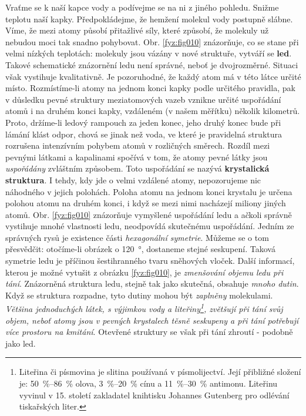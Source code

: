       Vraťme se k naší kapce vody a podívejme se na ni z jiného pohledu. Snižme teplotu naší kapky.
      Předpokládejme, že hemžení molekul vody postupně slábne. Víme, že mezi atomy působí přitažlivé
      síly, které způsobí, že molekuly už nebudou moci tak snadno pohybovat. Obr. \ref{fyz:fig010}
      znázorňuje, co se stane při velmi nízkých teplotách: molekuly jsou vázány v nové struktuře,
      vytváří se \textbf{led}. Takové schematické znázornění ledu není správné, neboť je
      dvojrozměrné. Situaci však vystihuje kvalitativně. Je pozoruhodné, že každý atom má v této
      látce určité místo. Rozmístíme-li atomy na jednom konci kapky podle určitého pravidla, pak v
      důsledku pevné struktury meziatomových vazeb vznikne určité uspořádání atomů i na druhém konci
      kapky, vzdáleném (v našem měřítku) několik kilometrů. Proto, držíme-li ledový rampouch za
      jeden konec, jeho druhý konec bude při lámání klást odpor, chová se jinak než voda, ve které
      je pravidelná struktura rozrušena intenzívním pohybem atomů v rozličných směrech. Rozdíl mezi
      pevnými látkami a kapalinami spočívá v tom, že atomy pevné látky jsou \emph{uspořádány}
      zvláštním způsobem. Toto uspořádání se nazývá \textbf{krystalická struktura}. I tehdy, kdy jde
      o velmi vzdálené atomy, nepozorujeme nic náhodného v jejich polohách. Poloha atomu na jednom
      konci krystalu je určena polohou atomu na druhém konci, i když se mezi nimi nacházejí miliony
      jiných atomů. Obr. \ref{fyz:fig010} znázorňuje vymyšlené uspořádání ledu a ačkoli správně
      vystihuje mnohé vlastnosti ledu, neodpovídá skutečnému uspořádání. Jedním ze správných rysů je
      existence části \emph{hexagonální symetrie}. Můžeme se o tom přesvědčit: otočíme-li obrázek o
      \SI{120}{\degree}, dostaneme stejné seskupení. Taková symetrie ledu je příčinou šestihranného
      tvaru sněhových vloček. Další informací, kterou je možné vytušit z obrázku \ref{fyz:fig010},
      je \emph{zmenšování objemu ledu při tání}. Znázorněná struktura ledu, stejně tak jako
      skutečná, obsahuje \emph{mnoho dutin}. Když se struktura rozpadne, tyto dutiny mohou být
      \emph{zaplněny} molekulami. \emph{Většina jednoduchých látek, s výjimkou vody a
      liteřiny\footnote{Liteřina či písmovina je slitina používaná v písmolijectví. Její přibližné
      složení je: \SIrange{50}{86}{\percent} olova, \SIrange{3}{20}{\percent} cínu a
      \SIrange{11}{30}{\percent} antimonu. Liteřinu vyvinul v 15. století zakladatel knihtisku
      Johannes Gutenberg pro odlévání tiskařských liter.}, zvětšují při tání svůj objem, neboť atomy
      jsou v pevných krystalech těsně seskupeny a při tání potřebují více prostoru na kmitání}.
      Otevřené struktury se však při tání zhroutí - podobně jako led.
      
